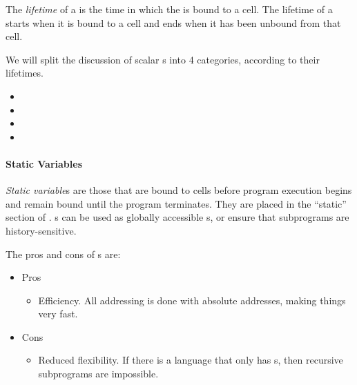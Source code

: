 \begin{definition}[Lifetime]\label{def:Variable_Lifetime}
  The \emph{lifetime} of a  is the time in which the  is bound to a  cell.
  The lifetime of a  starts when it is bound to a cell and ends when it has been unbound from that cell.

  We will split the discussion of scalar s into 4 categories, according to their lifetimes.
  \begin{itemize}[noitemsep]
  \item {}
  \item {}
  \item {}
  \item {}
  \end{itemize}
\end{definition}

\paragraph{Static Variables}\label{par:Static_Variable_Binding_Lifetime}
\begin{definition}\label{def:Static_Variable_Binding_Lifetime}
  \emph{Static variable}s are those that are bound to  cells before program execution begins and remain bound until the program terminates.
  They are placed in the ``static'' section of .
  s can be used as globally accessible s, or ensure that subprograms are history-sensitive.
\end{definition}

The pros and cons of s are:
\begin{itemize}[noitemsep]
\item Pros
  \begin{itemize}[noitemsep]
  \item Efficiency. All  addressing is done with absolute addresses, making things very fast.
  \end{itemize}
\item Cons
  \begin{itemize}[noitemsep]
  \item Reduced flexibility. If there is a language that only has s, then recursive subprograms are impossible.
  \end{itemize}
\end{itemize}

